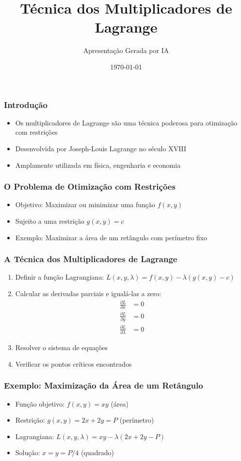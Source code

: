 \documentclass{beamer}
\title{Técnica dos Multiplicadores de Lagrange}
\author{Apresentação Gerada por IA}
\date{\today}
\begin{document}
\frame{\titlepage}

\begin{frame}
\frametitle{Introdução}
\begin{itemize}
    \item Os multiplicadores de Lagrange são uma técnica poderosa para otimização com restrições
    \item Desenvolvida por Joseph-Louis Lagrange no século XVIII
    \item Amplamente utilizada em física, engenharia e economia
\end{itemize}
\end{frame}

\begin{frame}
\frametitle{O Problema de Otimização com Restrições}
\begin{itemize}
    \item Objetivo: Maximizar ou minimizar uma função $f(x,y)$
    \item Sujeito a uma restrição $g(x,y) = c$
    \item Exemplo: Maximizar a área de um retângulo com perímetro fixo
\end{itemize}
\end{frame}

\begin{frame}
\frametitle{A Técnica dos Multiplicadores de Lagrange}
\begin{enumerate}
    \item Definir a função Lagrangiana: $L(x,y,\lambda) = f(x,y) - \lambda(g(x,y) - c)$
    \item Calcular as derivadas parciais e igualá-las a zero:
        \begin{align*}
        \frac{\partial L}{\partial x} &= 0 \\
        \frac{\partial L}{\partial y} &= 0 \\
        \frac{\partial L}{\partial \lambda} &= 0
        \end{align*}
    \item Resolver o sistema de equações
    \item Verificar os pontos críticos encontrados
\end{enumerate}
\end{frame}

\begin{frame}
\frametitle{Exemplo: Maximização da Área de um Retângulo}
\begin{itemize}
    \item Função objetivo: $f(x,y) = xy$ (área)
    \item Restrição: $g(x,y) = 2x + 2y = P$ (perímetro)
    \item Lagrangiana: $L(x,y,\lambda) = xy - \lambda(2x + 2y - P)$
    \item Solução: $x = y = P/4$ (quadrado)
\end{itemize}
\end{frame}
\end{document}
